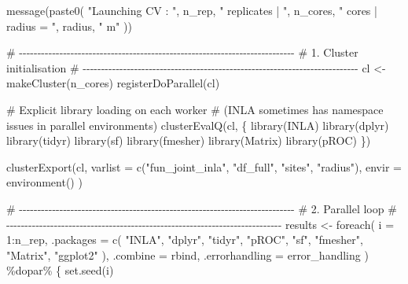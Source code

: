 \documentclass[
  letterpaper,
  DIV=11,
  numbers=noendperiod]{scrartcl}
\newenvironment{Shaded}{\begin{snugshade}}{\end{snugshade}}
\newcommand{\AttributeTok}[1]{\textcolor[rgb]{0.40,0.45,0.13}{#1}}
\newcommand{\CommentTok}[1]{\textcolor[rgb]{0.37,0.37,0.37}{#1}}
\newcommand{\DecValTok}[1]{\textcolor[rgb]{0.68,0.00,0.00}{#1}}
\newcommand{\FunctionTok}[1]{\textcolor[rgb]{0.28,0.35,0.67}{#1}}
\newcommand{\NormalTok}[1]{\textcolor[rgb]{0.00,0.23,0.31}{#1}}
\newcommand{\OtherTok}[1]{\textcolor[rgb]{0.00,0.23,0.31}{#1}}
\newcommand{\SpecialCharTok}[1]{\textcolor[rgb]{0.37,0.37,0.37}{#1}}
\newcommand{\StringTok}[1]{\textcolor[rgb]{0.13,0.47,0.30}{#1}}
\begin{document}
\begin{Shaded}
\begin{Highlighting}[]
  \FunctionTok{message}\NormalTok{(}\FunctionTok{paste0}\NormalTok{(}
    \StringTok{"Launching CV : "}\NormalTok{, n\_rep, }\StringTok{" replicates | "}\NormalTok{,}
\NormalTok{    n\_cores, }\StringTok{" cores | radius = "}\NormalTok{, radius, }\StringTok{" m"}
\NormalTok{  ))}

  \CommentTok{\# {-}{-}{-}{-}{-}{-}{-}{-}{-}{-}{-}{-}{-}{-}{-}{-}{-}{-}{-}{-}{-}{-}{-}{-}{-}{-}{-}{-}{-}{-}{-}{-}{-}{-}{-}{-}{-}{-}{-}{-}{-}{-}{-}{-}{-}{-}{-}{-}{-}{-}{-}{-}{-}{-}{-}{-}{-}{-}{-}{-}{-}{-}{-}{-}{-}{-}{-}{-}{-}{-}{-}{-}{-}{-}{-}}
  \CommentTok{\# 1. Cluster initialisation}
  \CommentTok{\# {-}{-}{-}{-}{-}{-}{-}{-}{-}{-}{-}{-}{-}{-}{-}{-}{-}{-}{-}{-}{-}{-}{-}{-}{-}{-}{-}{-}{-}{-}{-}{-}{-}{-}{-}{-}{-}{-}{-}{-}{-}{-}{-}{-}{-}{-}{-}{-}{-}{-}{-}{-}{-}{-}{-}{-}{-}{-}{-}{-}{-}{-}{-}{-}{-}{-}{-}{-}{-}{-}{-}{-}{-}{-}{-}}
\NormalTok{  cl }\OtherTok{\textless{}{-}} \FunctionTok{makeCluster}\NormalTok{(n\_cores)}
  \FunctionTok{registerDoParallel}\NormalTok{(cl)}

  \CommentTok{\# Explicit library loading on each worker}
  \CommentTok{\# (INLA sometimes has namespace issues in parallel environments)}
  \FunctionTok{clusterEvalQ}\NormalTok{(cl, \{}
    \FunctionTok{library}\NormalTok{(INLA)}
    \FunctionTok{library}\NormalTok{(dplyr)}
    \FunctionTok{library}\NormalTok{(tidyr)}
    \FunctionTok{library}\NormalTok{(sf)}
    \FunctionTok{library}\NormalTok{(fmesher)}
    \FunctionTok{library}\NormalTok{(Matrix)}
    \FunctionTok{library}\NormalTok{(pROC)}
\NormalTok{  \})}

  \FunctionTok{clusterExport}\NormalTok{(cl,}
    \AttributeTok{varlist =} \FunctionTok{c}\NormalTok{(}\StringTok{"fun\_joint\_inla"}\NormalTok{, }\StringTok{"df\_full"}\NormalTok{, }\StringTok{"sites"}\NormalTok{, }\StringTok{"radius"}\NormalTok{),}
    \AttributeTok{envir =} \FunctionTok{environment}\NormalTok{()}
\NormalTok{  )}

  \CommentTok{\# {-}{-}{-}{-}{-}{-}{-}{-}{-}{-}{-}{-}{-}{-}{-}{-}{-}{-}{-}{-}{-}{-}{-}{-}{-}{-}{-}{-}{-}{-}{-}{-}{-}{-}{-}{-}{-}{-}{-}{-}{-}{-}{-}{-}{-}{-}{-}{-}{-}{-}{-}{-}{-}{-}{-}{-}{-}{-}{-}{-}{-}{-}{-}{-}{-}{-}{-}{-}{-}{-}{-}{-}{-}{-}{-}}
  \CommentTok{\# 2. Parallel loop}
  \CommentTok{\# {-}{-}{-}{-}{-}{-}{-}{-}{-}{-}{-}{-}{-}{-}{-}{-}{-}{-}{-}{-}{-}{-}{-}{-}{-}{-}{-}{-}{-}{-}{-}{-}{-}{-}{-}{-}{-}{-}{-}{-}{-}{-}{-}{-}{-}{-}{-}{-}{-}{-}{-}{-}{-}{-}{-}{-}{-}{-}{-}{-}{-}{-}{-}{-}{-}{-}{-}{-}{-}{-}{-}{-}{-}{-}{-}}
\NormalTok{  results }\OtherTok{\textless{}{-}} \FunctionTok{foreach}\NormalTok{(}
    \AttributeTok{i =} \DecValTok{1}\SpecialCharTok{:}\NormalTok{n\_rep,}
    \AttributeTok{.packages =} \FunctionTok{c}\NormalTok{(}
      \StringTok{"INLA"}\NormalTok{, }\StringTok{"dplyr"}\NormalTok{, }\StringTok{"tidyr"}\NormalTok{, }\StringTok{"pROC"}\NormalTok{, }\StringTok{"sf"}\NormalTok{,}
      \StringTok{"fmesher"}\NormalTok{, }\StringTok{"Matrix"}\NormalTok{, }\StringTok{"ggplot2"}
\NormalTok{    ),}
    \AttributeTok{.combine =}\NormalTok{ rbind,}
    \AttributeTok{.errorhandling =}\NormalTok{ error\_handling}
\NormalTok{  ) }\SpecialCharTok{\%dopar\%}\NormalTok{ \{}
    \FunctionTok{set.seed}\NormalTok{(i)}


\end{Highlighting}
\end{Shaded}
\end{document}
